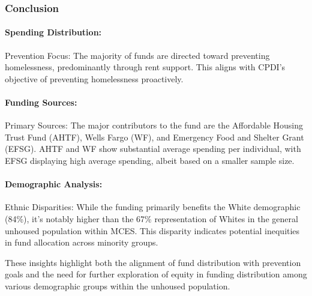 \documentclass[
]{article}
\begin{document}
\subsubsection{Conclusion}\label{conclusion}

\paragraph{Spending Distribution:}\label{spending-distribution}

Prevention Focus: The majority of funds are directed toward preventing
homelessness, predominantly through rent support. This aligns with
CPDI's objective of preventing homelessness proactively.

\paragraph{Funding Sources:}\label{funding-sources}

Primary Sources: The major contributors to the fund are the Affordable
Housing Trust Fund (AHTF), Wells Fargo (WF), and Emergency Food and
Shelter Grant (EFSG). AHTF and WF show substantial average spending per
individual, with EFSG displaying high average spending, albeit based on
a smaller sample size.

\paragraph{Demographic Analysis:}\label{demographic-analysis}

Ethnic Disparities: While the funding primarily benefits the White
demographic (84\%), it's notably higher than the 67\% representation of
Whites in the general unhoused population within MCES. This disparity
indicates potential inequities in fund allocation across minority
groups.

These insights highlight both the alignment of fund distribution with
prevention goals and the need for further exploration of equity in
funding distribution among various demographic groups within the
unhoused population.
\end{document}
